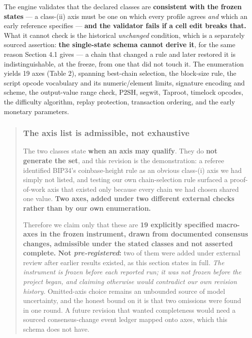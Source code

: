 \documentclass[
]{article}
\begin{document}
The engine validates that the declared classes are \textbf{consistent
with the frozen states} --- a class-(ii) axis must be one on which every
profile agrees \emph{and} which an early reference specifies ---
\textbf{and the validator fails if a cell edit breaks that.} What it
cannot check is the historical \emph{unchanged} condition, which is a
separately sourced assertion: \textbf{the single-state schema cannot
derive it}, for the same reason Section 4.1 gives --- a chain that
changed a rule and later restored it is indistinguishable, at the
freeze, from one that did not touch it. The enumeration yields 19 axes
(Table 2), spanning best-chain selection, the block-size rule, the
script opcode vocabulary and its numeric/element limits, signature
encoding and scheme, the output-value range check, P2SH, segwit,
Taproot, timelock opcodes, the difficulty algorithm, replay protection,
transaction ordering, and the early monetary parameters.

\begin{quote}
\mbox{}%
\subsubsection{The axis list is admissible, not
exhaustive}\label{the-axis-list-is-admissible-not-exhaustive}

The two classes state \textbf{when an axis may qualify}. They do
\textbf{not generate the set}, and this revision is the demonstration: a
referee identified BIP34's coinbase-height rule as an obvious class-(i)
axis we had simply not listed, and testing our own chain-selection rule
surfaced a proof-of-work axis that existed only because every chain we
had chosen shared one value. \textbf{Two axes, added under two different
external checks rather than by our own enumeration.}

Therefore we claim only that these are \textbf{19 explicitly specified
macro-axes in the frozen instrument, drawn from documented consensus
changes, admissible under the stated classes and not asserted complete.}
\textbf{Not \emph{pre-registered}:} two of them were added under
external review after earlier results existed, as this section states in
full. \emph{The instrument is frozen before each reported run; it was
not frozen before the project began, and claiming otherwise would
contradict our own revision history.} Omitted-axis choice remains an
unbounded source of model uncertainty, and the honest bound on it is
that two omissions were found in one round. A future revision that
wanted completeness would need a sourced consensus-change event ledger
mapped onto axes, which this schema does not have.
\end{quote}
\end{document}
